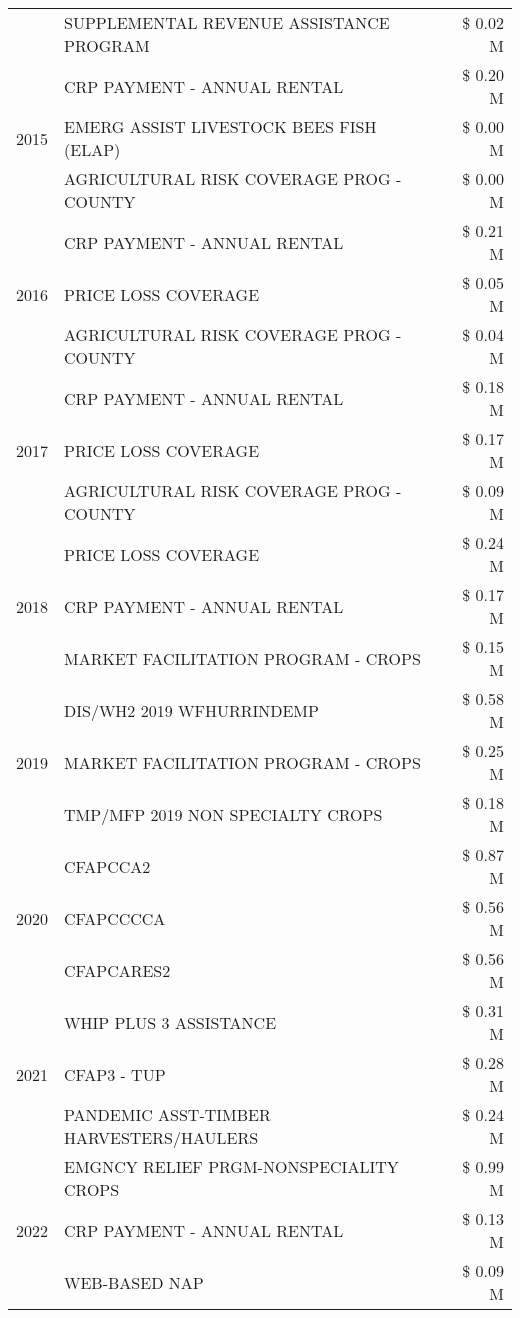 \begin{tabular}{llr}
 & SUPPLEMENTAL REVENUE ASSISTANCE PROGRAM & \$ 0.02 M \\
\cline{1-3}
\multirow[t]{3}{*}{2015} & CRP PAYMENT - ANNUAL RENTAL & \$ 0.20 M \\
 & EMERG ASSIST LIVESTOCK BEES FISH (ELAP) & \$ 0.00 M \\
 & AGRICULTURAL RISK COVERAGE PROG - COUNTY & \$ 0.00 M \\
\cline{1-3}
\multirow[t]{3}{*}{2016} & CRP PAYMENT - ANNUAL RENTAL & \$ 0.21 M \\
 & PRICE LOSS COVERAGE & \$ 0.05 M \\
 & AGRICULTURAL RISK COVERAGE PROG - COUNTY & \$ 0.04 M \\
\cline{1-3}
\multirow[t]{3}{*}{2017} & CRP PAYMENT - ANNUAL RENTAL & \$ 0.18 M \\
 & PRICE LOSS COVERAGE & \$ 0.17 M \\
 & AGRICULTURAL RISK COVERAGE PROG - COUNTY & \$ 0.09 M \\
\cline{1-3}
\multirow[t]{3}{*}{2018} & PRICE LOSS COVERAGE & \$ 0.24 M \\
 & CRP PAYMENT - ANNUAL RENTAL & \$ 0.17 M \\
 & MARKET FACILITATION PROGRAM - CROPS & \$ 0.15 M \\
\cline{1-3}
\multirow[t]{3}{*}{2019} & DIS/WH2 2019 WFHURRINDEMP & \$ 0.58 M \\
 & MARKET FACILITATION PROGRAM - CROPS & \$ 0.25 M \\
 & TMP/MFP 2019 NON SPECIALTY CROPS & \$ 0.18 M \\
\cline{1-3}
\multirow[t]{3}{*}{2020} & CFAPCCA2 & \$ 0.87 M \\
 & CFAPCCCCA & \$ 0.56 M \\
 & CFAPCARES2 & \$ 0.56 M \\
\cline{1-3}
\multirow[t]{3}{*}{2021} & WHIP PLUS 3 ASSISTANCE & \$ 0.31 M \\
 & CFAP3 - TUP & \$ 0.28 M \\
 & PANDEMIC ASST-TIMBER HARVESTERS/HAULERS & \$ 0.24 M \\
\cline{1-3}
\multirow[t]{3}{*}{2022} & EMGNCY RELIEF PRGM-NONSPECIALITY CROPS & \$ 0.99 M \\
 & CRP PAYMENT - ANNUAL RENTAL & \$ 0.13 M \\
 & WEB-BASED NAP & \$ 0.09 M \\
\cline{1-3}
\bottomrule
\end{tabular}
